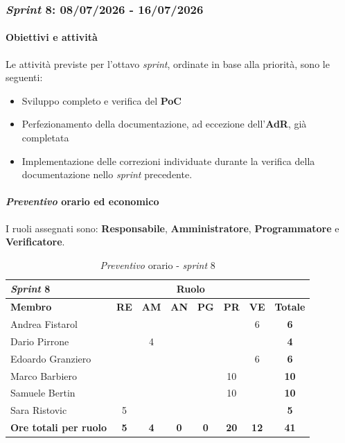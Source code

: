 \documentclass[12pt, a4paper]{article}
\begin{document}
{\subsubsection{\textit{Sprint} 8: 08/07/2026 - 16/07/2026}

\paragraph{Obiettivi e attività}

Le attività previste per l'ottavo \textit{sprint}, ordinate in base alla priorità, sono le seguenti:

\begin{itemize}
    \item Sviluppo completo e verifica del \textbf{PoC}
    \item Perfezionamento della documentazione, ad eccezione dell'\textbf{AdR}, già completata
    \item Implementazione delle correzioni individuate durante la verifica della documentazione nello \textit{sprint} precedente.
\end{itemize}

\paragraph{\textit{Preventivo} orario ed economico}

I ruoli assegnati sono: \textbf{Responsabile}, \textbf{Amministratore}, \textbf{Programmatore} e \textbf{Verificatore}.
\begin{table}[H]
    \centering
    \renewcommand{\arraystretch}{1.3}
    \begin{tabularx}{0.9\textwidth}{|X|c|c|c|c|c|c|c|}
        \hline
        \textbf{\textit{Sprint} 8} & \multicolumn{6}{|c|}{\textbf{Ruolo}} & \\ \hline
        \textbf{Membro} & \textbf{RE} & \textbf{AM} & \textbf{AN} &
        \textbf{PG} & \textbf{PR} & \textbf{VE} & \textbf{Totale} \\ \hline
        Andrea Fistarol & & & &  & & 6 & \textbf{6} \\ \hline
        Dario Pirrone & & 4 & & & & & \textbf{4} \\ \hline
        Edoardo Granziero & & & & & & 6 & \textbf{6} \\ \hline
        Marco Barbiero & & & & & 10 & & \textbf{10} \\ \hline
        Samuele Bertin & & & & & 10 & & \textbf{10} \\ \hline
        Sara Ristovic & 5 & & & & & & \textbf{5} \\ \hline
        \textbf{Ore totali per ruolo} & \textbf{5} & \textbf{4} &
        \textbf{0} & \textbf{0} & \textbf{20} & \textbf{12} & \textbf{41}\\ \hline
    \end{tabularx}
    \caption{\textit{Preventivo} orario - \textit{sprint} 8}
\end{table}

}
\end{document}
